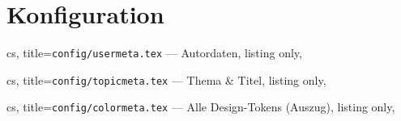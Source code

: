 \documentclass[a4paper, 11pt, ngerman]{article}
\begin{document}
\clearpage

\section*{Konfiguration}

\noindent
\begin{minipage}[t]{0.487\linewidth}

\begin{tcblisting}{cs,
  title={\texttt{config/usermeta.tex} — Autordaten},
  listing only,
}
\newcommand{\docauthor}{Max Mustermann}
\newcommand{\doccourse}{Informatik B.Sc.}
\newcommand{\docstudentid}{12345678}
\newcommand{\docsemester}{SoSe 2025}
\newcommand{\docdate}{\today}
\end{tcblisting}

\vspace{0.4em}

\begin{tcblisting}{cs,
  title={\texttt{config/topicmeta.tex} — Thema \& Titel},
  listing only,
}
\newcommand{\doctitle}{Grundlagen der Algorithmen}
\newcommand{\docsubtitle}{Zusammenfassung und Lernzettel}
\newcommand{\docsubject}{Algorithmen und Datenstrukturen}
\newcommand{\docdescription}{%
  Prüfungsvorbereitung für Semester 3.%
}
\end{tcblisting}

\end{minipage}%
\hfill
\begin{minipage}[t]{0.487\linewidth}

\begin{tcblisting}{cs,
  title={\texttt{config/colormeta.tex} — Alle Design-Tokens (Auszug)},
  listing only,
}
\newcommand{\mainfont}{TeX Gyre Pagella}
\newcommand{\sansfont}{TeX Gyre Heros}
\newcommand{\monofont}{TeX Gyre Cursor}

\newcommand{\contentmargin}{2.5cm}
\newcommand{\parskipval}{6pt}
\newcommand{\boxinnersep}{10pt}

\end{tcblisting}

\end{minipage}
\end{document}
